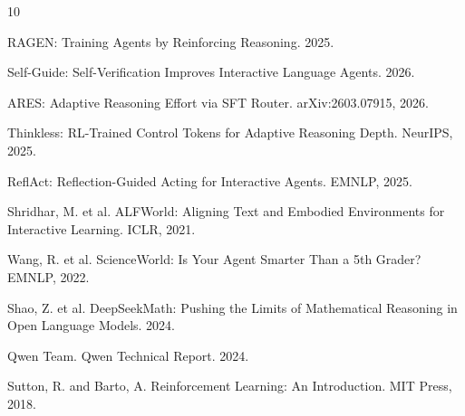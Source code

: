 \documentclass[11pt]{article}
\begin{document}

\begin{thebibliography}{10}

RAGEN: Training Agents by Reinforcing Reasoning. 2025.

Self-Guide: Self-Verification Improves Interactive Language Agents. 2026.

ARES: Adaptive Reasoning Effort via SFT Router. arXiv:2603.07915, 2026.

Thinkless: RL-Trained Control Tokens for Adaptive Reasoning Depth. NeurIPS, 2025.

ReflAct: Reflection-Guided Acting for Interactive Agents. EMNLP, 2025.

Shridhar, M. et al. ALFWorld: Aligning Text and Embodied Environments for Interactive Learning. ICLR, 2021.

Wang, R. et al. ScienceWorld: Is Your Agent Smarter Than a 5th Grader? EMNLP, 2022.

Shao, Z. et al. DeepSeekMath: Pushing the Limits of Mathematical Reasoning in Open Language Models. 2024.

Qwen Team. Qwen Technical Report. 2024.

Sutton, R. and Barto, A. Reinforcement Learning: An Introduction. MIT Press, 2018.

\end{thebibliography}
\end{document}
